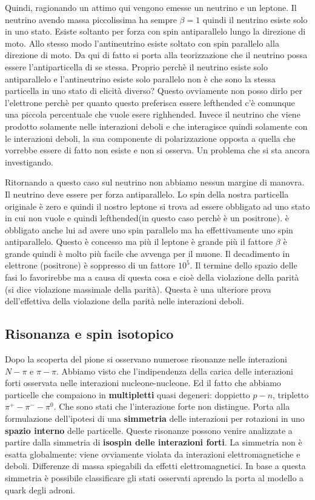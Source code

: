 Quindi, ragionando un attimo qui vengono emesse un neutrino e un leptone. Il neutrino avendo massa piccolissima ha sempre $\beta=1$ quindi il neutrino esiste solo in uno stato. Esiste soltanto per forza con spin antiparallelo lungo la direzione di moto. Allo stesso modo l'antineutrino esiste soltato con spin parallelo alla direzione di moto. Da qui di fatto si porta alla teorizzazione che il neutrino possa essere l'antiparticella di se stessa. Proprio perchè il neutrino esiste solo antiparallelo e l'antineutrino esiste solo parallelo non è che sono la stessa particella in uno stato di elicità diverso? Questo ovviamente non posso dirlo per l'elettrone perchè per quanto questo preferisca essere lefthended c'è comunque una piccola percentuale che vuole esere righhended. Invece il neutrino che viene prodotto solamente nelle interazioni deboli e che interagisce quindi solamente con le interazioni deboli, la sua componente di polarizzazione opposta a quella che vorrebbe essere di fatto non esiste e non si osserva. Un problema che si sta ancora investigando. 

Ritornando a questo caso sul neutrino non abbiamo nessun margine di manovra. Il neutrino deve essere per forza antiparallelo. Lo spin della nostra particella originale è zero e quindi il nostro leptone si trova ad essere obbligato ad uno stato in cui non vuole e quindi lefthended(in questo caso perchè è un positrone). è obbligato anche lui ad avere uno spin parallelo ma ha effettivamente uno spin antiparallelo. Questo è concesso ma più il leptone è grande più il fattore $\beta$ è grande quindi è molto più facile che avvenga per il muone. Il decadimento in elettrone (positrone) è soppresso di un fattore $10^{5}$. Il termine dello spazio delle fasi lo favorirebbe ma a causa di questa cosa e cioè della violazione della parità (si dice violazione massimale della parità). Questa è una ulteriore prova dell'effettiva della violazione della parità nelle interazioni deboli.
\subsection{Risonanza e spin isotopico}
Dopo la scoperta del pione si osservano numerose risonanze nelle interazioni $N-\pi$ e $\pi-\pi$. Abbiamo visto che l'indipendenza della carica delle interazioni forti osservata nelle interazioni nucleone-nucleone. Ed il fatto che abbiamo particelle che compaiono in \textbf{multipletti} quasi degeneri: doppietto $p-n$, tripletto $\pi^+-\pi^--\pi^0$. Che sono stati che l'interazione forte non distingue. Porta alla formulazione dell'ipotesi di una \textbf{simmetria} delle interazioni per rotazioni in uno \textbf{spazio interno} delle particelle.  Queste risonanze possono venire analizzate a partire dalla simmetria di \textbf{isospin delle interazioni forti}. La simmetria non è esatta globalmente: viene ovviamente violata da interazioni elettromagnetiche e deboli. Differenze di massa spiegabili da effetti elettromagnetici. In base a questa simmetria è possibile classificare gli stati osservati aprendo la porta al modello a quark degli adroni.
